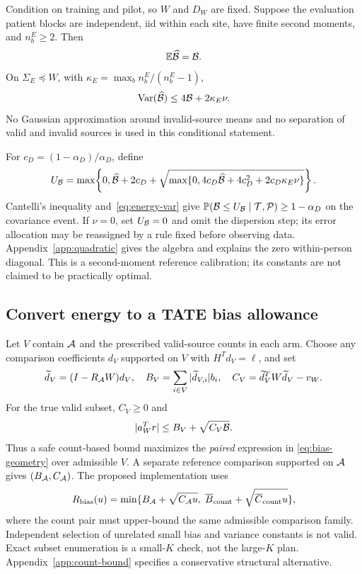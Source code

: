 \begin{proposition}\label{prop:ustat}
Condition on training and pilot, so $W$ and $D_W$ are fixed. Suppose the
evaluation patient blocks are independent, iid within each site, have finite
second moments, and $n_b^E\ge2$. Then
\[
 \mathbb E\widehat{\mathcal B}=\mathcal B.
\]
On $\Sigma_E\preceq W$, with $\kappa_E=\max_b n_b^E/(n_b^E-1)$,
\begin{equation}
 \operatorname{Var}(\widehat{\mathcal B})\le4\mathcal B+2\kappa_E\nu.\label{eq:energy-var}
\end{equation}
No Gaussian approximation around invalid-source means and no separation of
valid and invalid sources is used in this conditional statement.
\end{proposition}

For $c_D=(1-\alpha_D)/\alpha_D$, define
\begin{equation}
 U_{\mathcal B}=\max\!\left\{0,\widehat{\mathcal B}+2c_D+
 \sqrt{\max\{0,4c_D\widehat{\mathcal B}+4c_D^2+2c_D\kappa_E\nu\}}\right\}.
 \label{eq:energy-upper}
\end{equation}
Cantelli's inequality and~\eqref{eq:energy-var} give
$\mathbb P(\mathcal B\le U_{\mathcal B}\mid\mathcal T,\mathcal P)\ge1-\alpha_D$ on the covariance
event. If $\nu=0$, set $U_{\mathcal B}=0$ and omit the dispersion step; its error
allocation may be reassigned by a rule fixed before observing data.
Appendix~\ref{app:quadratic} gives the algebra and explains the zero
within-person diagonal. This is a second-moment reference calibration;
its constants are not claimed to be practically optimal.

\subsection{Convert energy to a TATE bias allowance}
Let $V$ contain $\mathcal A$ and the prescribed valid-source counts in each arm.
Choose any comparison coefficients $d_V$ supported on $V$ with
$H^Td_V=\ell$, and set
\begin{equation}
 \widetilde d_V=(I-R_{\mathcal A}W)d_V,\quad
 B_V=\sum_{i\in V}|\widetilde d_{V,i}|b_i,\quad
 C_V=\widetilde d_V^TW\widetilde d_V-v_W.\label{eq:comparison-pair}
\end{equation}
For the true valid subset, $C_V\ge0$ and
\begin{equation}
 |a_W^Tr|\le B_V+\sqrt{C_V\mathcal B}.\label{eq:bias-geometry}
\end{equation}
Thus a safe count-based bound maximizes the \emph{paired} expression in
\eqref{eq:bias-geometry} over admissible $V$. A separate reference comparison
supported on $\mathcal A$ gives $(B_{\mathcal A},C_{\mathcal A})$. The proposed implementation
uses
\begin{equation}
 R_{\rm bias}(u)=\min\{B_{\mathcal A}+\sqrt{C_{\mathcal A}u},\;
                         \overline B_{\rm count}+\sqrt{\overline C_{\rm count}u}\},
 \label{eq:bias-radius}
\end{equation}
where the count pair must upper-bound the same admissible comparison family.
Independent selection of unrelated small bias and variance constants is not
valid. Exact subset enumeration is a small-$K$ check, not the large-$K$ plan.
Appendix~\ref{app:count-bound} specifies a conservative structural alternative.

